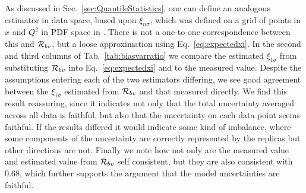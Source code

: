 As discussed in Sec.~\ref{sec:QuantileStatistics}, one can define an analogous
estimator in data space, based upon $\xi_{n\sigma}$, which was defined on a grid
of points in $x$ and $Q^2$ in PDF space in \cite{nnpdf30}. There is not a
one-to-one correspondence between this and $\mathcal{R}_{bv}$, but a loose
approximation using Eq.~\ref{eq:expectedxi}. In the second and third columns of
Tab.~\ref{tab:biasvarratio} we compare the estimated $\xi_{1\sigma}$ from
substituting $\mathcal{R}_{bv}$ into Eq.~\ref{eq:expectedxi} and to the measured
value. Despite the assumptions entering each of the two estimators differing, we
see good agreement between the $\xi_{1\sigma}$ estimated from $\mathcal{R}_{bv}$
and that measured directly. We find this result reassuring, since it indicates
not only that the total uncertainty averaged across all data is faithful, but
also that the uncertainty on each data point seems faithful. If the results
differed it would indicate some kind of imbalance, where some components of the
uncertainty are correctly represented by the replicas but other directions are
not. Finally we note how not only are the measured value and estimated value
from $\mathcal{R}_{bv}$ self consistent, but they are also consistent with $0.68$,
which further supports the argument that the model uncertainties are faithful.
